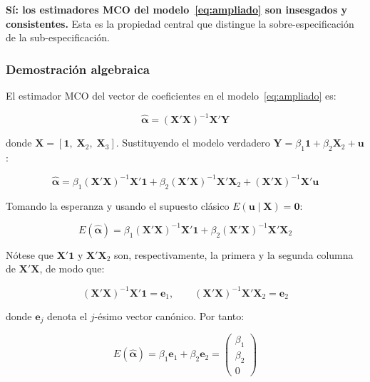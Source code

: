 \documentclass[12pt, letterpaper]{article}
\begin{document}
\textbf{Sí: los estimadores MCO del modelo~\eqref{eq:ampliado} son
insesgados y consistentes.} Esta es la propiedad central que distingue la
sobre-especificación de la sub-especificación.

\subsubsection{Demostración algebraica}

El estimador MCO del vector de coeficientes en el modelo~\eqref{eq:ampliado} es:

\begin{equation}
  \hat{\boldsymbol{\alpha}} = (\mathbf{X}'\mathbf{X})^{-1}\mathbf{X}'\mathbf{Y}
\end{equation}

donde $\mathbf{X} = [\mathbf{1},\; \mathbf{X}_2,\; \mathbf{X}_3]$.
Sustituyendo el modelo verdadero
$\mathbf{Y} = \beta_1\mathbf{1} + \beta_2\mathbf{X}_2 + \mathbf{u}$:

\begin{equation}
  \hat{\boldsymbol{\alpha}}
  = \beta_1(\mathbf{X}'\mathbf{X})^{-1}\mathbf{X}'\mathbf{1}
  + \beta_2(\mathbf{X}'\mathbf{X})^{-1}\mathbf{X}'\mathbf{X}_2
  + (\mathbf{X}'\mathbf{X})^{-1}\mathbf{X}'\mathbf{u}
\end{equation}

Tomando la esperanza y usando el supuesto clásico
$E(\mathbf{u}\mid\mathbf{X}) = \mathbf{0}$:

\begin{equation}
  E(\hat{\boldsymbol{\alpha}})
  = \beta_1(\mathbf{X}'\mathbf{X})^{-1}\mathbf{X}'\mathbf{1}
  + \beta_2(\mathbf{X}'\mathbf{X})^{-1}\mathbf{X}'\mathbf{X}_2
\end{equation}

Nótese que $\mathbf{X}'\mathbf{1}$ y $\mathbf{X}'\mathbf{X}_2$ son,
respectivamente, la primera y la segunda columna de $\mathbf{X}'\mathbf{X}$,
de modo que:

\begin{equation}
  (\mathbf{X}'\mathbf{X})^{-1}\mathbf{X}'\mathbf{1} = \mathbf{e}_1,
  \qquad
  (\mathbf{X}'\mathbf{X})^{-1}\mathbf{X}'\mathbf{X}_2 = \mathbf{e}_2
\end{equation}

donde $\mathbf{e}_j$ denota el $j$-ésimo vector canónico. Por tanto:

\begin{equation}
  E(\hat{\boldsymbol{\alpha}}) = \beta_1\mathbf{e}_1 + \beta_2\mathbf{e}_2
  =
  \begin{pmatrix}\beta_1 \\ \beta_2 \\ 0\end{pmatrix}
\end{equation}
\end{document}

